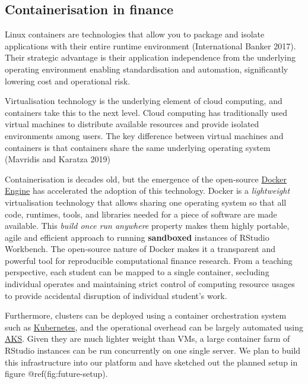 \documentclass{article}
\begin{document}
\hypertarget{containerisation-in-finance}{%
\subsection{Containerisation in
finance}\label{containerisation-in-finance}}

Linux containers are technologies that allow you to package and isolate
applications with their entire runtime environment (International Banker
2017). Their strategic advantage is their application independence from
the underlying operating environment enabling standardisation and
automation, significantly lowering cost and operational risk.

Virtualisation technology is the underlying element of cloud computing,
and containers take this to the next level. Cloud computing has
traditionally used virtual machines to distribute available resources
and provide isolated environments among users. The key difference
between virtual machines and containers is that containers share the
same underlying operating system (Mavridis and Karatza 2019)

Containerisation is decades old, but the emergence of the open-source
\href{https://www.ibm.com/cloud/learn/docker}{Docker Engine} has
accelerated the adoption of this technology. Docker is a
\emph{lightweight} virtualisation technology that allows sharing one
operating system so that all code, runtimes, tools, and libraries needed
for a piece of software are made available. This \emph{build once run
anywhere} property makes them highly portable, agile and efficient
approach to running \textbf{sandboxed} instances of RStudio Workbench.
The open-source nature of Docker makes it a transparent and powerful
tool for reproducible computational finance research. From a teaching
perspective, each student can be mapped to a single container, secluding
individual operates and maintaining strict control of computing resource
usages to provide accidental disruption of individual student's work.

Furthermore, clusters can be deployed using a container orchestration
system such as
\href{https://www.ibm.com/cloud/learn/kubernetes}{Kubernetes}, and the
operational overhead can be largely automated using
\href{https://docs.microsoft.com/en-us/azure/aks/intro-kubernetes}{AKS}.
Given they are much lighter weight than VMs, a large container farm of
RStudio instances can be run concurrently on one single server. We plan
to build this infrastructure into our platform and have sketched out the
planned setup in figure @ref(fig:future-setup).
\end{document}
